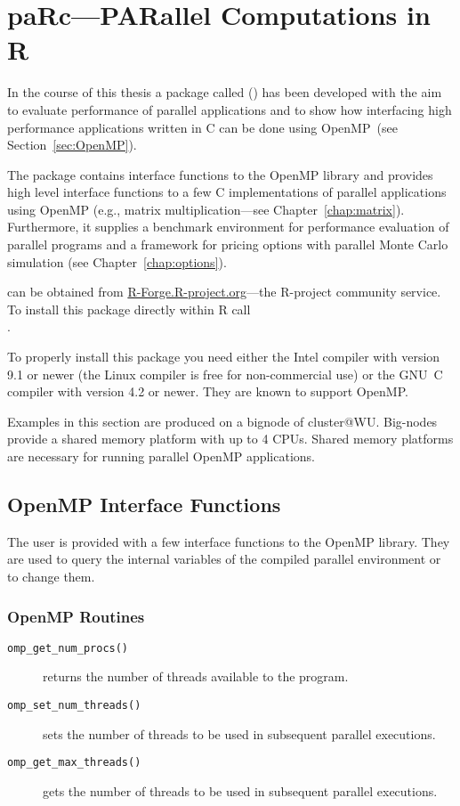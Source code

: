 \section{paRc---PARallel Computations in R}
\label{sec:paRc}

In the course of this thesis a package called 
(\cite{theussl07paRc}) has been developed with the aim
to evaluate performance of parallel applications and to show how
interfacing high performance applications written in C can be done
using OpenMP~(see Section~\ref{sec:OpenMP}).

The package  contains interface functions to the OpenMP library
and provides high level interface functions to a few C implementations
of parallel applications using OpenMP (e.g., matrix multiplication---see
Chapter~\ref{chap:matrix}).
Furthermore, it supplies a benchmark environment for performance
evaluation of parallel programs and a framework for pricing options
with parallel Monte Carlo simulation (see
Chapter~\ref{chap:options}).

 can be obtained from \url{R-Forge.R-project.org}---the
R-project community service. To install this package directly within R
call \\ .

To properly install this package you need either the Intel compiler
with version 9.1 or newer (the Linux compiler is free for
non-commercial use) or the GNU~C compiler with version 4.2 or
newer. They are known to support OpenMP.

Examples in this section are produced on a bignode of
cluster@WU. Big-nodes provide a shared memory platform with up to 4
CPUs. Shared memory platforms are necessary for running parallel
OpenMP applications.

\subsection{OpenMP Interface Functions}

The user is provided with a few interface functions to the OpenMP
library. They are used to query the internal variables of the compiled
parallel environment or to change them.

\subsubsection{OpenMP Routines}
\begin{description}
\item[\texttt{omp\_get\_num\_procs()}] returns the number of threads
  available to the program.
\item[\texttt{omp\_set\_num\_threads()}] sets the number of threads to be
  used in subsequent parallel executions.
\item[\texttt{omp\_get\_max\_threads()}] gets the number of threads to be
  used in subsequent parallel executions.
\end{description}

